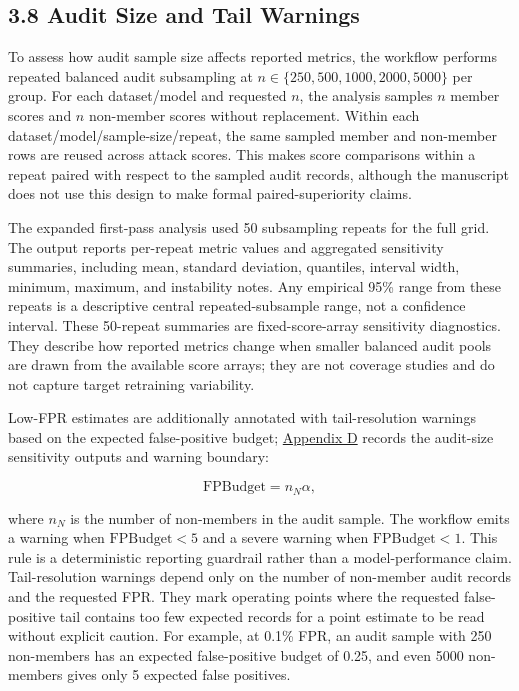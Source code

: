 \documentclass[
  10pt,
  twocolumn]{article}
\begin{document}
\hypertarget{audit-size-and-tail-warnings}{%
\subsection{3.8 Audit Size and Tail Warnings}\label{audit-size-and-tail-warnings}}

To assess how audit sample size affects reported metrics, the workflow performs repeated balanced audit subsampling at \(n \in \{250, 500, 1000, 2000, 5000\}\) per group. For each dataset/model and requested \(n\), the analysis samples \(n\) member scores and \(n\) non-member scores without replacement. Within each dataset/model/sample-size/repeat, the same sampled member and non-member rows are reused across attack scores. This makes score comparisons within a repeat paired with respect to the sampled audit records, although the manuscript does not use this design to make formal paired-superiority claims.

The expanded first-pass analysis used 50 subsampling repeats for the full grid. The output reports per-repeat metric values and aggregated sensitivity summaries, including mean, standard deviation, quantiles, interval width, minimum, maximum, and instability notes. Any empirical 95\% range from these repeats is a descriptive central repeated-subsample range, not a confidence interval. These 50-repeat summaries are fixed-score-array sensitivity diagnostics. They describe how reported metrics change when smaller balanced audit pools are drawn from the available score arrays; they are not coverage studies and do not capture target retraining variability.

Low-FPR estimates are additionally annotated with tail-resolution warnings based on the expected false-positive budget; \protect\hyperlink{appendix-d-audit-size-sensitivity-and-tail-resolution-warnings}{Appendix D} records the audit-size sensitivity outputs and warning boundary:

\[
\mathrm{FPBudget} = n_N \alpha,
\]

where \(n_N\) is the number of non-members in the audit sample. The workflow emits a warning when \(\mathrm{FPBudget} < 5\) and a severe warning when \(\mathrm{FPBudget} < 1\). This rule is a deterministic reporting guardrail rather than a model-performance claim. Tail-resolution warnings depend only on the number of non-member audit records and the requested FPR. They mark operating points where the requested false-positive tail contains too few expected records for a point estimate to be read without explicit caution. For example, at 0.1\% FPR, an audit sample with 250 non-members has an expected false-positive budget of 0.25, and even 5000 non-members gives only 5 expected false positives.
\end{document}
